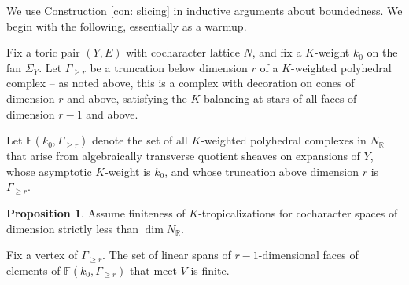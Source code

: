 \documentclass[11pt]{amsart}
\theoremstyle{definition}
\theoremstyle{definition}
\newtheorem{proposition}[theorem]{Proposition}
\begin{document}
We use Construction \ref{con: slicing} in inductive arguments about boundedness. We begin with the following, essentially as a warmup. 

Fix a toric pair $(Y,E)$ with cocharacter lattice $N$, and fix a $K$-weight $k_0$ on the fan $\Sigma_Y$. Let $\Gamma_{\geq r}$ be a truncation below dimension $r$ of a $K$-weighted polyhedral complex -- as noted above, this is a complex with decoration on cones of dimension $r$ and above, satisfying the $K$-balancing at stars of all faces of dimension $r-1$ and above. 

Let $\mathbb F(k_0,\Gamma_{\geq r})$ denote the set of all $K$-weighted polyhedral complexes in $N_{\mathbb R}$ that arise from algebraically transverse quotient sheaves on expansions of $Y$, whose asymptotic $K$-weight is $k_0$, and whose truncation above dimension $r$ is $\Gamma_{\geq r}$. 

\begin{proposition}\label{prop:PluckerBound}
Assume finiteness of $K$-tropicalizations for cocharacter spaces of dimension strictly less than $\dim N_{\mathbb R}$. 

Fix a vertex of $\Gamma_{\geq r}$. The set of linear spans of $r-1$-dimensional faces of elements of $\mathbb F(k_0,\Gamma_{\geq r})$ that meet $V$ is finite. 
\end{proposition}
\end{document}
